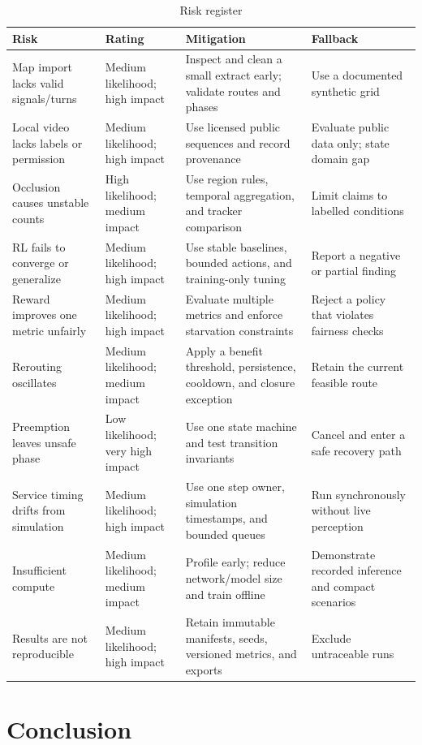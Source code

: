 \begin{longtable}{P{0.20\textwidth}P{0.16\textwidth}P{0.34\textwidth}P{0.19\textwidth}}
\caption{Risk register}\label{tab:risks}\\
\toprule
\textbf{Risk} & \textbf{Rating} & \textbf{Mitigation} & \textbf{Fallback}\\
\midrule\endfirsthead
Map import lacks valid signals/turns & Medium likelihood; high impact & Inspect and clean a small extract early; validate routes and phases & Use a documented synthetic grid\\
Local video lacks labels or permission & Medium likelihood; high impact & Use licensed public sequences and record provenance & Evaluate public data only; state domain gap\\
Occlusion causes unstable counts & High likelihood; medium impact & Use region rules, temporal aggregation, and tracker comparison & Limit claims to labelled conditions\\
RL fails to converge or generalize & Medium likelihood; high impact & Use stable baselines, bounded actions, and training-only tuning & Report a negative or partial finding\\
Reward improves one metric unfairly & Medium likelihood; high impact & Evaluate multiple metrics and enforce starvation constraints & Reject a policy that violates fairness checks\\
Rerouting oscillates & Medium likelihood; medium impact & Apply a benefit threshold, persistence, cooldown, and closure exception & Retain the current feasible route\\
Preemption leaves unsafe phase & Low likelihood; very high impact & Use one state machine and test transition invariants & Cancel and enter a safe recovery path\\
Service timing drifts from simulation & Medium likelihood; high impact & Use one step owner, simulation timestamps, and bounded queues & Run synchronously without live perception\\
Insufficient compute & Medium likelihood; medium impact & Profile early; reduce network/model size and train offline & Demonstrate recorded inference and compact scenarios\\
Results are not reproducible & Medium likelihood; high impact & Retain immutable manifests, seeds, versioned metrics, and exports & Exclude untraceable runs\\
\bottomrule
\end{longtable}

\section{Conclusion}


